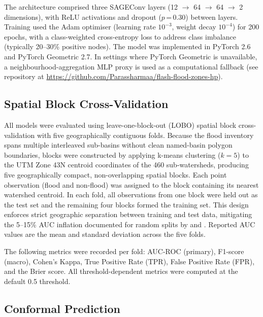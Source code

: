 The architecture comprised three SAGEConv layers
(12 $\to$ 64 $\to$ 64 $\to$ 2 dimensions),
with ReLU activations and dropout ($p$\,=\,0.30) between layers.
Training used the Adam optimiser (learning rate $10^{-3}$, weight decay $10^{-4}$)
for 200 epochs, with a class-weighted cross-entropy loss to address
class imbalance (typically 20--30\% positive nodes).
The model was implemented in PyTorch 2.6 and PyTorch Geometric 2.7.
In settings where PyTorch Geometric is unavailable,
a neighbourhood-aggregation MLP proxy is used as a computational fallback
(see repository at \url{https://github.com/Parassharmaa/flash-flood-zones-hp}).

\subsection{Spatial Block Cross-Validation}
\label{sec:validation}

All models were evaluated using leave-one-block-out (LOBO) spatial block
cross-validation with five geographically contiguous folds.
Because the flood inventory spans multiple interleaved sub-basins without clean
named-basin polygon boundaries, blocks were constructed by applying k-means
clustering ($k = 5$) to the UTM Zone 43N centroid coordinates of the 460
sub-watersheds, producing five geographically compact, non-overlapping spatial blocks.
Each point observation (flood and non-flood) was assigned to the block containing
its nearest watershed centroid.
In each fold, all observations from one block were held out as the test set
and the remaining four blocks formed the training set.
This design enforces strict geographic separation between training and test data,
mitigating the 5--15\% AUC inflation documented for random splits by
\citet{valavi2019} and \citet{roberts2017cross}.
Reported AUC values are the mean and standard deviation across the five folds.

The following metrics were recorded per fold:
AUC-ROC (primary), F1-score (macro), Cohen's Kappa,
True Positive Rate (TPR), False Positive Rate (FPR),
and the Brier score.
All threshold-dependent metrics were computed at the default 0.5 threshold.

\subsection{Conformal Prediction}
\label{sec:conformal}

